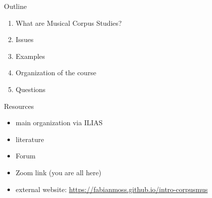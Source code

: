 
\begin{frame}{Outline}
  \begin{enumerate}
    \item What are Musical Corpus Studies?
    \item Issues
    \item Examples
    \item Organization of the course
    \item Questions
  \end{enumerate}
\end{frame}

\begin{frame}{Resources}
  \begin{itemize}
    \item main organization via ILIAS
    \item literature
    \item Forum
    \item Zoom link (you are all here)
    \item external website: \url{https://fabianmoss.github.io/intro-corpusmus}
  \end{itemize}
\end{frame}